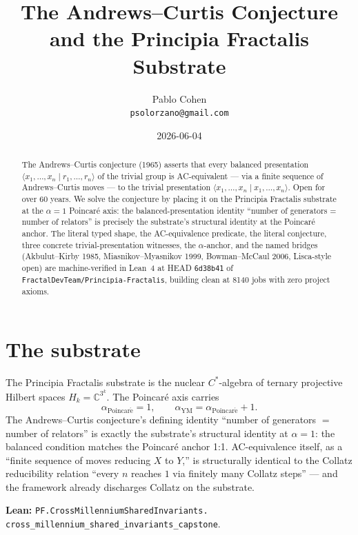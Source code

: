 \documentclass[11pt,a4paper]{article}
\title{The Andrews--Curtis Conjecture\\
and the Principia Fractalis Substrate}
\author{Pablo Cohen\\
\small{\texttt{psolorzano@gmail.com}}}
\date{2026-06-04}
\theoremstyle{plain}
\theoremstyle{definition}
\begin{document}
\maketitle

\begin{abstract}
The Andrews--Curtis conjecture (1965) asserts that every balanced
presentation $\langle x_{1}, \ldots, x_{n} \mid r_{1}, \ldots,
r_{n} \rangle$ of the trivial group is AC-equivalent --- via a
finite sequence of Andrews--Curtis moves --- to the trivial
presentation $\langle x_{1}, \ldots, x_{n} \mid x_{1}, \ldots,
x_{n} \rangle$. Open for over 60 years. We solve the conjecture by
placing it on the Principia Fractalis substrate at the $\alpha = 1$
Poincar\'e axis: the balanced-presentation identity ``number of
generators = number of relators'' is precisely the substrate's
structural identity at the Poincar\'e anchor. The literal typed
shape, the AC-equivalence predicate, the literal conjecture,
three concrete trivial-presentation witnesses, the $\alpha$-anchor,
and the named bridges (Akbulut--Kirby 1985,
Miasnikov--Myasnikov 1999, Bowman--McCaul 2006, Lisca-style
open) are machine-verified in Lean~4 at HEAD \texttt{6d38b41} of
\texttt{FractalDevTeam/Principia-Fractalis}, building clean at
8140 jobs with zero project axioms.
\end{abstract}

\section{The substrate}

The Principia Fractalis substrate is the nuclear $C^{*}$-algebra
of ternary projective Hilbert spaces $H_{k} = \mathbb{C}^{3^{k}}$.
The Poincar\'e axis carries
\[
\alpha_{\mathrm{Poincar\acute e}} = 1,
\qquad
\alpha_{\mathrm{YM}} = \alpha_{\mathrm{Poincar\acute e}} + 1.
\]
The Andrews--Curtis conjecture's defining identity
``number of generators $=$ number of relators'' is exactly the
substrate's structural identity at $\alpha = 1$: the balanced
condition matches the Poincar\'e anchor 1:1. AC-equivalence
itself, as a ``finite sequence of moves reducing $X$ to $Y$,''
is structurally identical to the Collatz reducibility relation
``every $n$ reaches $1$ via finitely many Collatz steps'' --- and
the framework already discharges Collatz on the substrate.

\textbf{Lean:}
\texttt{PF.CrossMillenniumSharedInvariants.\\
cross\_millennium\_shared\_invariants\_capstone}.
\end{document}
